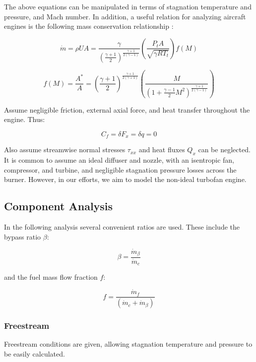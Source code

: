 \documentclass{article}
\begin{document}
The above equations can be manipulated in terms of stagnation temperature and pressure, and Mach number. In addition, a useful relation for analyzing aircraft engines is the following mass conservation relationship \cite{cantwell283}:

\begin{equation}
\label{eq:mdot}
\dot{m} = \rho U A = \frac{\gamma}{\left( \frac{\gamma + 1}{2} \right)^{ \frac{\gamma + 1}{2 (\gamma - 1)}}} \left( \frac{P_t A}{\sqrt{ \gamma R T_t}} \right) f(M)
\end{equation}

\begin{equation}
\label{eq:area_mach_function}
f(M) = \frac{A^*}{A} = \left( \frac{\gamma + 1}{2} \right)^{\frac{\gamma + 1}{2 (\gamma + 1)}} \left( \frac{M}{\left( 1 + \frac{\gamma -1}{2} M^2 \right)^{\frac{\gamma + 1}{2 (\gamma - 1)}}}\right)
\end{equation}

Assume negligible friction, external axial force, and heat transfer throughout the engine. Thus:

\begin{equation*}
C_f = \delta F_x = \delta q = 0
\end{equation*}

Also assume streamwise normal stresses $\tau_{xx}$ and heat fluxes $Q_x$ can be neglected. It is common to assume an ideal diffuser and nozzle, with an isentropic fan, compressor, and turbine, and negligible stagnation pressure losses across the burner. However, in our efforts, we aim to model the non-ideal turbofan engine.

\subsection{Component Analysis}

In the following analysis several convenient ratios are used. These include the bypass ratio $\beta$:

\begin{equation*}
\beta = \frac{\dot{m}_{\beta}}{\dot{m}_c}
\end{equation*}

and the fuel mass flow fraction $f$:

\begin{equation*}
f = \frac{\dot{m}_f}{\left( \dot{m}_c + \dot{m}_{\beta} \right)}
\end{equation*}

\subsubsection{Freestream}
Freestream conditions are given, allowing stagnation temperature and pressure to be easily calculated.
\end{document}
